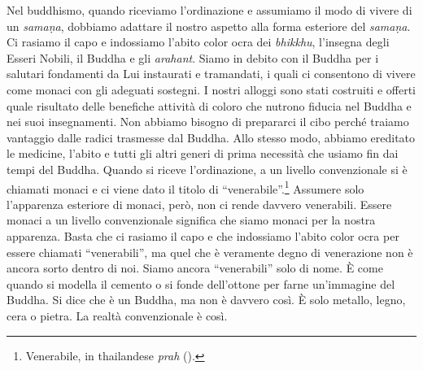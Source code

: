 Nel buddhismo, quando riceviamo l'ordinazione e assumiamo il modo di
vivere di un \emph{samaṇa}, dobbiamo adattare il nostro aspetto alla
forma esteriore del \emph{samaṇa}. Ci rasiamo il capo e indossiamo
l'abito color ocra dei \emph{bhikkhu}, l'insegna degli Esseri Nobili, il
Buddha e gli \emph{arahant}. Siamo in debito con il Buddha per i
salutari fondamenti da Lui instaurati e tramandati, i quali ci
consentono di vivere come monaci con gli adeguati sostegni. I nostri
alloggi sono stati costruiti e offerti quale risultato delle benefiche
attività di coloro che nutrono fiducia nel Buddha e nei suoi
insegnamenti. Non abbiamo bisogno di prepararci il cibo perché traiamo
vantaggio dalle radici trasmesse dal Buddha. Allo stesso modo, abbiamo
ereditato le medicine, l'abito e tutti gli altri generi di prima
necessità che usiamo fin dai tempi del Buddha. Quando si riceve
l'ordinazione, a un livello convenzionale si è chiamati monaci e ci
viene dato il titolo di ``venerabile''.\footnote{Venerabile, in
  thailandese \emph{prah} ().} Assumere solo l'apparenza esteriore di
monaci, però, non ci rende davvero venerabili. Essere monaci a un
livello convenzionale significa che siamo monaci per la nostra
apparenza. Basta che ci rasiamo il capo e che indossiamo l'abito color
ocra per essere chiamati ``venerabili'', ma quel che è veramente degno
di venerazione non è ancora sorto dentro di noi. Siamo ancora
``venerabili'' solo di nome. È come quando si modella il cemento o si
fonde dell'ottone per farne un'immagine del Buddha. Si dice che è un
Buddha, ma non è davvero così. È solo metallo, legno, cera o pietra. La
realtà convenzionale è così.

